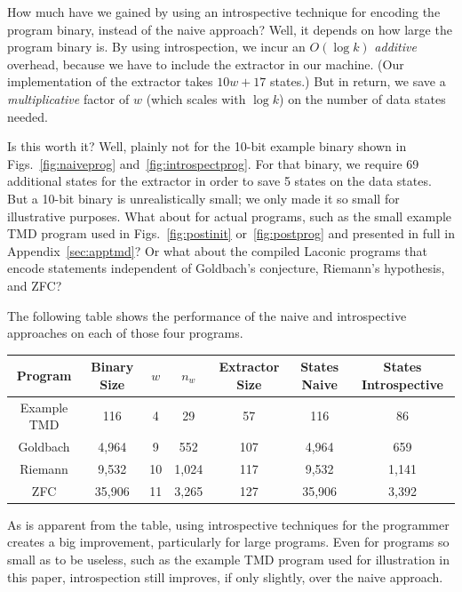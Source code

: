 \documentclass[11pt]{article}
\begin{document}
How much have we gained by using an introspective technique for encoding the program binary, instead of the naive approach? Well, it depends on how large the program binary is. By using introspection, we incur an $O(\log k)$ \emph{additive} overhead, because we have to include the extractor in our machine. (Our implementation of the extractor takes $10w + 17$ states.) But in return, we save a \emph{multiplicative} factor of $w$ (which scales with $\log k$) on the number of data states needed. 

Is this worth it? Well, plainly not for the 10-bit example binary shown in Figs.~\ref{fig:naiveprog} and~\ref{fig:introspectprog}. For that binary, we require 69 additional states for the extractor in order to save 5 states on the data states. But a 10-bit binary is unrealistically small; we only made it so small for illustrative purposes. What about for actual programs, such as the small example TMD program used in Figs.~\ref{fig:postinit} or~\ref{fig:postprog} and presented in full in Appendix~\ref{sec:apptmd}? Or what about the compiled Laconic programs that encode statements independent of Goldbach's conjecture, Riemann's hypothesis, and ZFC?

The following table shows the performance of the naive and introspective approaches on each of those four programs.

\begin{center}
    \begin{tabular}{||c c c c c c c||}
    \hline
    Program & Binary Size & $w$ & $n_w$ & Extractor Size & States Naive & States Introspective \\ [0.5ex]
    \hline\hline
    Example TMD & 116 & 4 & 29 & 57 & 116 & 86 \\
    \hline
    Goldbach & 4,964 & 9 & 552 & 107 & 4,964 & 659 \\
    \hline
    Riemann & 9,532 & 10 & 1,024 & 117 & 9,532 & 1,141 \\
    \hline 
    ZFC & 35,906 & 11 & 3,265 & 127 & 35,906 & 3,392 \\
    \hline
    \end{tabular}
\end{center}
     
As is apparent from the table, using introspective techniques for the programmer creates a big improvement, particularly for large programs. Even for programs so small as to be useless, such as the example TMD program used for illustration in this paper, introspection still improves, if only slightly, over the naive approach. \\
\end{document}
